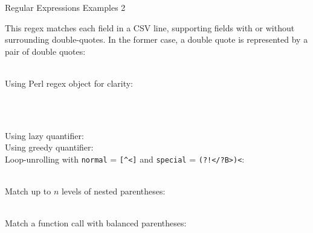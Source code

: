 \documentclass[11pt, a4paper, landscape]{scrartcl}
\newcommand{\regex}[1]{\texttt{#1}}
\newcommand{\cregex}[1]{\colorbox{gray!30}{\regex{#1}}}
\newcommand{\reshortexample}[1]{\cregex{}}
\newcommand{\relongexample}[1]{\regex{}}
\begin{document}
\begin{cheatsheet}{Regular Expressions Examples 2}

\begin{col1}


This regex matches each field in a CSV line, supporting fields with or without
surrounding double-quotes. In the former case, a double quote is represented by
a pair of double quotes:\\
\relongexample{./parse_csv.tex}\\


Using Perl regex object for clarity:\\
\relongexample{./ip.tex}\\


\relongexample{./email_addr.tex}

\end{col1}

\begin{col2}


\relongexample{./url.tex}\\


Using lazy quantifier:
\reshortexample{./matchclosetag_lazy.tex}\\
Using greedy quantifier:
\reshortexample{./matchclosetag_greedy.tex}\\
Loop-unrolling with
\regex{normal} = \cregex{[\^{}<]} and
\regex{special} = \cregex{(?!</?B>)<}:\\
\relongexample{./matchclosetag_lu.tex}\\

\end{col2}

\begin{col3}


Match up to $n$ levels of nested parentheses:\\
\relongexample{./balanced_paren_static.tex}\\


Match a function call with balanced parentheses:\\
\relongexample{./balanced_paren_dynamic.tex}\\

\end{col3}

\end{cheatsheet}
\end{document}
